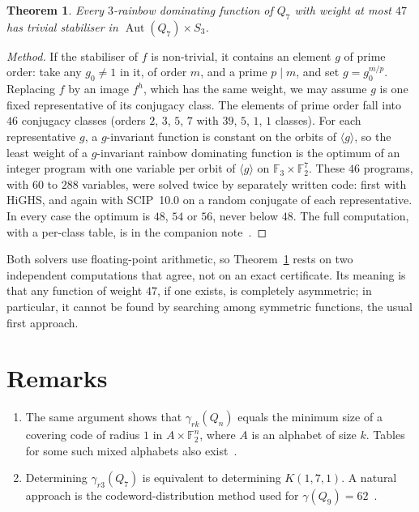 \documentclass[11pt]{article}
\newtheorem{theorem}{Theorem}
\theoremstyle{definition}
\theoremstyle{remark}
\newcommand{\F}{\mathbb{F}}
\begin{document}
\begin{theorem}\label{thm:sym}
Every $3$-rainbow dominating function of $Q_7$ with weight at most $47$ has trivial stabiliser in
$\operatorname{Aut}(Q_7)\times S_3$.
\end{theorem}

\begin{proof}[Method]
If the stabiliser of $f$ is non-trivial, it contains an element $g$ of prime order: take any
$g_0\neq 1$ in it, of order $m$, and a prime $p\mid m$, and set $g=g_0^{m/p}$. Replacing $f$ by
an image $f^{h}$, which has the same weight, we may assume $g$ is one fixed representative of its
conjugacy class. The elements of prime order fall into $46$ conjugacy classes (orders $2$, $3$,
$5$, $7$ with $39$, $5$, $1$, $1$ classes). For each representative $g$, a $g$-invariant function
is constant on the orbits of $\langle g\rangle$, so the least weight of a $g$-invariant rainbow
dominating function is the optimum of an integer program with one variable per orbit of
$\langle g\rangle$ on $\F_3\times\F_2^7$. These $46$ programs, with $60$ to $288$ variables, were
solved twice by separately written code: first with HiGHS, and again with SCIP~10.0 on a random
conjugate of each representative. In every case the optimum is $48$, $54$ or $56$, never below
$48$. The full computation, with a per-class table, is in the companion note~\cite{companion}.
\end{proof}

Both solvers use floating-point arithmetic, so Theorem~\ref{thm:sym} rests on two independent
computations that agree, not on an exact certificate. Its meaning is that any function of weight
$47$, if one exists, is completely asymmetric; in particular, it cannot be found by searching
among symmetric functions, the usual first approach.

\section{Remarks}

\begin{enumerate}
\item The same argument shows that $\gamma_{rk}(Q_n)$ equals the minimum size of a covering code of
  radius $1$ in $A\times\F_2^n$, where $A$ is an alphabet of size $k$. Tables for some such mixed
  alphabets also exist~\cite{keri}.
\item Determining $\gamma_{r3}(Q_7)$ is equivalent to determining $K(1,7,1)$. A natural approach is
  the codeword-distribution method used for $\gamma(Q_9)=62$~\cite{ob}.
\end{enumerate}
\end{document}
